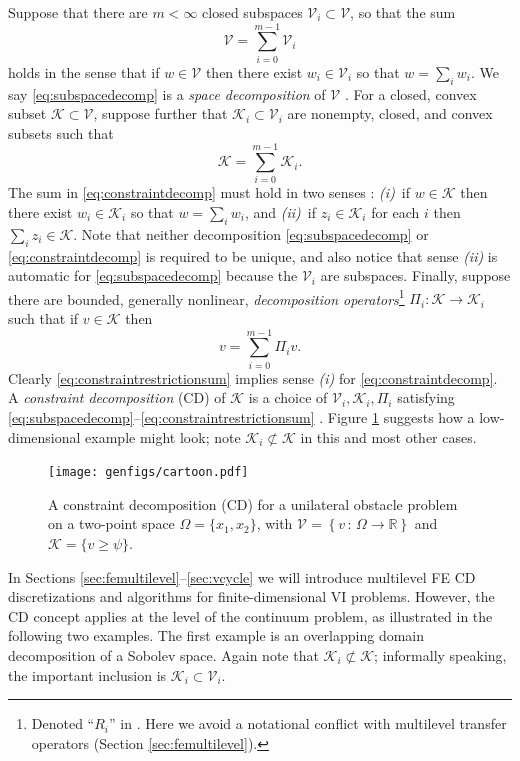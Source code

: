 \documentclass[letterpaper,final,12pt,reqno]{amsart}
\theoremstyle{cstyle}
\theoremstyle{cstyle*}
\theoremstyle{dstyle}
\numberwithin{equation}{section}
\numberwithin{figure}{section}
\numberwithin{table}{section}
\numberwithin{theorem}{section}
\newcommand{\RR}{\mathbb{R}}
\newcommand{\cK}{\mathcal{K}}
\newcommand{\cV}{\mathcal{V}}
\begin{document}
Suppose that there are $m<\infty$ closed subspaces $\cV_i \subset \cV$, so that the sum
\begin{equation}
\cV = \sum_{i=0}^{m-1} \cV_i \label{eq:subspacedecomp}
\end{equation}
holds in the sense that if $w \in \cV$ then there exist $w_i \in \cV_i$ so that $w = \sum_i w_i$.  We say \eqref{eq:subspacedecomp} is a \emph{space decomposition} of $\cV$ \cite{Xu1992}.  For a closed, convex subset $\cK \subset \cV$, suppose further that $\cK_i \subset \cV_i$ are nonempty, closed, and convex subsets such that
\begin{equation}
\cK = \sum_{i=0}^{m-1} \cK_i. \label{eq:constraintdecomp}
\end{equation}
The sum in \eqref{eq:constraintdecomp} must hold in two senses \cite{TaiTseng2002}: \emph{(i)}~if $w \in \cK$ then there exist $w_i \in \cK_i$ so that $w = \sum_i w_i$, and \emph{(ii)}~if $z_i \in \cK_i$ for each $i$ then $\sum_i z_i \in \cK$.  Note that neither decomposition \eqref{eq:subspacedecomp} or \eqref{eq:constraintdecomp} is required to be unique, and also notice that sense \emph{(ii)} is automatic for \eqref{eq:subspacedecomp} because the $\cV_i$ are subspaces.  Finally, suppose there are bounded, generally nonlinear, \emph{decomposition operators}\footnote{Denoted ``$R_i$'' in \cite{Tai2003}.  Here we avoid a notational conflict with multilevel transfer operators (Section \ref{sec:femultilevel}).} $\Pi_i : \cK \to \cK_i$ such that if $v \in \cK$ then
\begin{equation}
v = \sum_{i=0}^{m-1} \Pi_i v.  \label{eq:constraintrestrictionsum}
\end{equation}
Clearly \eqref{eq:constraintrestrictionsum} implies sense \emph{(i)} for \eqref{eq:constraintdecomp}.  A \emph{constraint decomposition} (CD) of $\cK$ is a choice of $\cV_i,\cK_i,\Pi_i$ satisfying \eqref{eq:subspacedecomp}--\eqref{eq:constraintrestrictionsum} \cite{Tai2003}.  Figure \ref{fig:cartoon} suggests how a low-dimensional example might look; note $\cK_i \not\subset \cK$ in this and most other cases.

\begin{figure}[ht]
\texttt{[image: genfigs/cartoon.pdf]}
\caption{A constraint decomposition (CD) for a unilateral obstacle problem on a two-point space $\Omega=\{x_1,x_2\}$, with $\mathcal{V}=\left\{v \,:\, \Omega \to \RR\right\}$ and $\mathcal{K}=\{v\ge \psi\}$.}
\label{fig:cartoon}
\end{figure}

In Sections \ref{sec:femultilevel}--\ref{sec:vcycle} we will introduce multilevel FE CD discretizations and algorithms for finite-dimensional VI problems.  However, the CD concept applies at the level of the continuum problem, as illustrated in the following two examples.  The first example is an overlapping domain decomposition of a Sobolev space.  Again note that $\cK_i \not\subset \cK$; informally speaking, the important inclusion is $\cK_i \subset \cV_i$.
\end{document}
